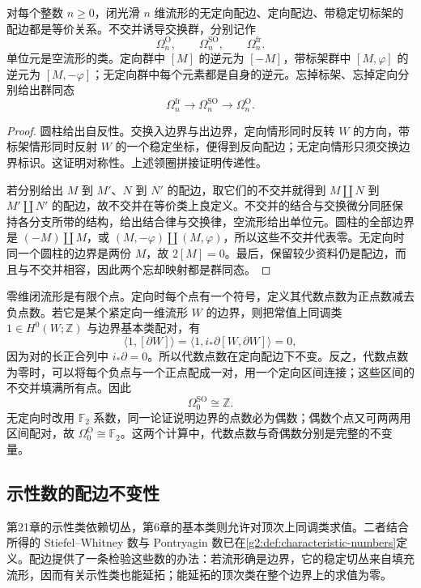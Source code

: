 \begin{proposition}\label{g2:prop:bordism-group}
	对每个整数 \(n\ge0\)，闭光滑 \(n\) 维流形的无定向配边、定向配边、带稳定切标架的配边都是等价关系。不交并诱导交换群，分别记作
	\[
		\Omega_n^{\mathrm O},\qquad\Omega_n^{\mathrm{SO}},\qquad\Omega_n^{\mathrm{fr}}.
	\]
	单位元是空流形的类。定向群中 \([M]\) 的逆元为 \([-M]\)，带标架群中 \([M,\varphi]\) 的逆元为 \([M,-\varphi]\)；无定向群中每个元素都是自身的逆元。忘掉标架、忘掉定向分别给出群同态
	\[
		\Omega_n^{\mathrm{fr}}\longrightarrow\Omega_n^{\mathrm{SO}}\longrightarrow\Omega_n^{\mathrm O}.
	\]
\end{proposition}
\begin{proof}
	圆柱给出自反性。交换入边界与出边界，定向情形同时反转 \(W\) 的方向，带标架情形同时反射 \(W\) 的一个稳定坐标，便得到反向配边；无定向情形只须交换边界标识。这证明对称性。上述领圈拼接证明传递性。

	若分别给出 \(M\) 到 \(M'\)、\(N\) 到 \(N'\) 的配边，取它们的不交并就得到 \(M\amalg N\) 到 \(M'\amalg N'\) 的配边，故不交并在等价类上良定义。不交并的结合与交换微分同胚保持各分支所带的结构，给出结合律与交换律，空流形给出单位元。圆柱的全部边界是 \((-M)\amalg M\)，或 \((M,-\varphi)\amalg(M,\varphi)\)，所以这些不交并代表零。无定向时同一个圆柱的边界是两份 \(M\)，故 \(2[M]=0\)。最后，保留较少资料仍是配边，而且与不交并相容，因此两个忘却映射都是群同态。
\end{proof}

\begin{example}\label{g2:exm:zero-dimensional-bordism}
	零维闭流形是有限个点。定向时每个点有一个符号，定义其代数点数为正点数减去负点数。若它是某个紧定向一维流形 \(W\) 的边界，则把常值上同调类 \(1\in H^0(W;\mathbb Z)\) 与边界基本类配对，有
	\[
		\langle1,[\partial W]\rangle
		=\langle1,i_*\partial[W,\partial W]\rangle=0,
	\]
	因为对的长正合列中 \(i_*\partial=0\)。所以代数点数在定向配边下不变。反之，代数点数为零时，可以将每个负点与一个正点配成一对，用一个定向区间连接；这些区间的不交并填满所有点。因此
	\[
		\Omega_0^{\mathrm{SO}}\cong\mathbb Z.
	\]
	无定向时改用 \(\mathbb F_2\) 系数，同一论证说明边界的点数必为偶数；偶数个点又可两两用区间配对，故 \(\Omega_0^{\mathrm O}\cong\mathbb F_2\)。这两个计算中，代数点数与奇偶数分别是完整的不变量。
\end{example}

\subsection{示性数的配边不变性}
\label{g2:subsec:2301:03}
第21章的示性类依赖切丛，第6章的基本类则允许对顶次上同调类求值。二者结合所得的 Stiefel--Whitney 数与 Pontryagin 数已在\cref{g2:def:characteristic-numbers}定义。配边提供了一条检验这些数的办法：若流形确是边界，它的稳定切丛来自填充流形，因而有关示性类也能延拓；能延拓的顶次类在整个边界上的求值为零。

